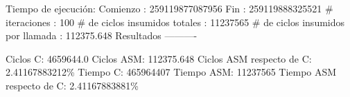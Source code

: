 \documentclass[10pt, a4paper]{article}
\begin{document}
\begin{itemize}
Tiempo de ejecución:\newline
  Comienzo                          : 259119877087956\newline
  Fin                               : 259119888325521\newline
  \# iteraciones                     : 100\newline
  \# de ciclos insumidos totales     : 11237565\newline
  \# de ciclos insumidos por llamada : 112375.648\newline
\newline
Resultados\newline
----------

Ciclos C:                 4659644.0\newline
Ciclos ASM:               112375.648\newline
Ciclos ASM respecto de C: 2.41167883212\%\newline
Tiempo C:                 465964407\newline
Tiempo ASM:               11237565\newline
Tiempo ASM respecto de C: 2.41167883881\%\newline


\end{itemize}
\end{document}
